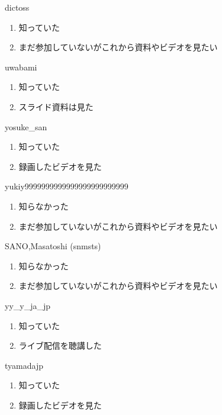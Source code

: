 \begin{prework}{ dictoss }
  \begin{enumerate}
  \item 知っていた
  \item まだ参加していないがこれから資料やビデオを見たい
  \end{enumerate}
\end{prework}

\begin{prework}{ uwabami }
  \begin{enumerate}
  \item 知っていた
  \item スライド資料は見た
  \end{enumerate}
\end{prework}

\begin{prework}{ yosuke\_san }
  \begin{enumerate}
  \item 知っていた
  \item 録画したビデオを見た
  \end{enumerate}
\end{prework}

\begin{prework}{ yukiy9999999999999999999999999 }
  \begin{enumerate}
  \item 知らなかった
  \item まだ参加していないがこれから資料やビデオを見たい
  \end{enumerate}
\end{prework}

\begin{prework}{ SANO,Masatoshi (snmsts) }
  \begin{enumerate}
  \item 知らなかった
  \item まだ参加していないがこれから資料やビデオを見たい
  \end{enumerate}
\end{prework}

\begin{prework}{ yy\_y\_ja\_jp }
  \begin{enumerate}
  \item 知っていた
  \item ライブ配信を聴講した
  \end{enumerate}
\end{prework}

\begin{prework}{ tyamadajp }
  \begin{enumerate}
  \item 知っていた
  \item 録画したビデオを見た
  \end{enumerate}
\end{prework}
